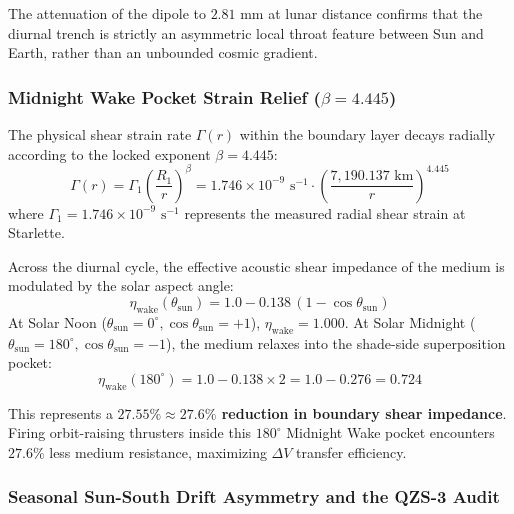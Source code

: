 \documentclass[11pt,a4paper]{article}
\begin{document}
The attenuation of the dipole to $2.81\text{ mm}$ at lunar distance confirms that the diurnal trench is strictly an asymmetric local throat feature between Sun and Earth, rather than an unbounded cosmic gradient.

\subsubsection{Midnight Wake Pocket Strain Relief ($\beta = 4.445$)}
\label{subsubsec:wake_strain_relief}

The physical shear strain rate $\Gamma(r)$ within the boundary layer decays radially according to the locked exponent $\beta = 4.445$:
\begin{equation}
\Gamma(r) = \Gamma_1 \left(\frac{R_1}{r}\right)^\beta = 1.746 \times 10^{-9}\text{ s}^{-1} \cdot \left(\frac{7{,}190.137\text{ km}}{r}\right)^{4.445}
\label{eq:shear_strain_rate}
\end{equation}
where $\Gamma_1 = 1.746 \times 10^{-9}\text{ s}^{-1}$ represents the measured radial shear strain at Starlette.

Across the diurnal cycle, the effective acoustic shear impedance of the medium is modulated by the solar aspect angle:
\begin{equation}
\eta_{\text{wake}}(\theta_{\text{sun}}) = 1.0 - 0.138 \, (1 - \cos\theta_{\text{sun}})
\label{eq:wake_impedance}
\end{equation}
At Solar Noon ($\theta_{\text{sun}} = 0^\circ, \cos\theta_{\text{sun}} = +1$), $\eta_{\text{wake}} = 1.000$. At Solar Midnight ($\theta_{\text{sun}} = 180^\circ, \cos\theta_{\text{sun}} = -1$), the medium relaxes into the shade-side superposition pocket:
\begin{equation}
\eta_{\text{wake}}(180^\circ) = 1.0 - 0.138 \times 2 = 1.0 - 0.276 = \mathbf{0.724}
\label{eq:midnight_impedance_val}
\end{equation}

This represents a \textbf{$27.55\% \approx 27.6\%$ reduction in boundary shear impedance}. Firing orbit-raising thrusters inside this $180^\circ$ Midnight Wake pocket encounters $27.6\%$ less medium resistance, maximizing $\Delta V$ transfer efficiency.

\subsubsection{Seasonal Sun-South Drift Asymmetry and the QZS-3 Audit}
\label{subsubsec:qzs3_seasonal}
\end{document}
